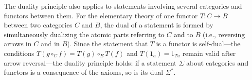 The duality principle also applies to statements involving several categories and functors between them. For the elementary theory of one functor $T: C \to B$ between two categories $C$ and $B$, the dual of a statement is formed by simultaneously dualizing the atomic parts referring to $C$ and to $B$ (i.e., reversing arrows in $C$ and in $B$). Since the statement that $T$ is a functor is self-dual---the conditions $T(g \circ_C f) = T(g) \circ_B T(f)$ and $T(1_a) = 1_{Ta}$ remain valid after arrow reversal---the duality principle holds: if a statement $\Sigma$ about categories and functors is a consequence of the axioms, so is its dual $\Sigma^{*}$.
